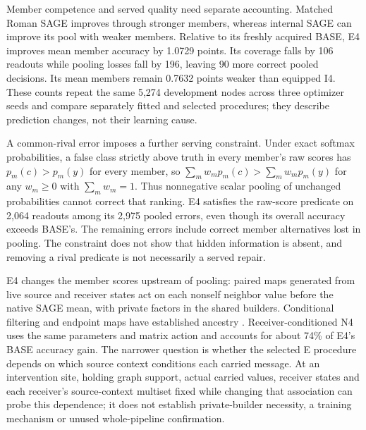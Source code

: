 
Member competence and served quality need separate accounting. Matched Roman SAGE improves through stronger members, whereas internal SAGE can improve its pool with weaker members. Relative to its freshly acquired BASE, E4 improves mean member accuracy by 1.0729 points. Its coverage falls by 106 readouts while pooling losses fall by 196, leaving 90 more correct pooled decisions. Its mean members remain 0.7632 points weaker than equipped I4. These counts repeat the same 5,274 development nodes across three optimizer seeds and compare separately fitted and selected procedures; they describe prediction changes, not their learning cause.

A common-rival error imposes a further serving constraint. Under exact softmax probabilities, a false class strictly above truth in every member's raw scores has $p_m(c)>p_m(y)$ for every member, so $\sum_m w_m p_m(c)>\sum_m w_m p_m(y)$ for any $w_m\geq0$ with $\sum_m w_m=1$. Thus nonnegative scalar pooling of unchanged probabilities cannot correct that ranking. E4 satisfies the raw-score predicate on 2,064 readouts among its 2,975 pooled errors, even though its overall accuracy exceeds BASE's. The remaining errors include correct member alternatives lost in pooling. The constraint does not show that hidden information is absent, and removing a rival predicate is not necessarily a served repair.

E4 changes the member scores upstream of pooling: paired maps generated from live source and receiver states act on each nonself neighbor value before the native SAGE mean, with private factors in the shared builders. Conditional filtering and endpoint maps have established ancestry \citep{simonovsky2017ecc,brockschmidt2020film,bodnar2022sheaf,bourgerie2026deepnsd}. Receiver-conditioned N4 uses the same parameters and matrix action and accounts for about 74\% of E4's BASE accuracy gain. The narrower question is whether the selected E procedure depends on which source context conditions each carried message. At an intervention site, holding graph support, actual carried values, receiver states and each receiver's source-context multiset fixed while changing that association can probe this dependence; it does not establish private-builder necessity, a training mechanism or unused whole-pipeline confirmation.
